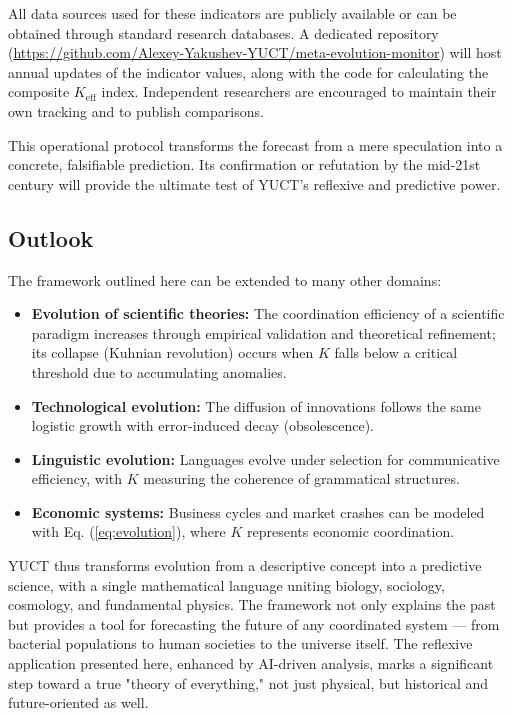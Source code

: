 \documentclass[12pt,a4paper]{article}
\theoremstyle{remark}
\begin{document}
	All data sources used for these indicators are publicly available or can be obtained through standard research databases. A dedicated repository (\url{https://github.com/Alexey-Yakushev-YUCT/meta-evolution-monitor}) will host annual updates of the indicator values, along with the code for calculating the composite \(K_{\text{eff}}\) index. Independent researchers are encouraged to maintain their own tracking and to publish comparisons.
	
	This operational protocol transforms the forecast from a mere speculation into a concrete, falsifiable prediction. Its confirmation or refutation by the mid‑21st century will provide the ultimate test of YUCT’s reflexive and predictive power.
	
	\subsection*{Outlook}
	
	The framework outlined here can be extended to many other domains:
	\begin{itemize}
		\item \textbf{Evolution of scientific theories:} The coordination efficiency of a scientific paradigm increases through empirical validation and theoretical refinement; its collapse (Kuhnian revolution) occurs when $K$ falls below a critical threshold due to accumulating anomalies.
		\item \textbf{Technological evolution:} The diffusion of innovations follows the same logistic growth with error-induced decay (obsolescence).
		\item \textbf{Linguistic evolution:} Languages evolve under selection for communicative efficiency, with $K$ measuring the coherence of grammatical structures.
		\item \textbf{Economic systems:} Business cycles and market crashes can be modeled with Eq. (\ref{eq:evolution}), where $K$ represents economic coordination.
	\end{itemize}
	
	YUCT thus transforms evolution from a descriptive concept into a predictive science, with a single mathematical language uniting biology, sociology, cosmology, and fundamental physics. The framework not only explains the past but provides a tool for forecasting the future of any coordinated system — from bacterial populations to human societies to the universe itself. The reflexive application presented here, enhanced by AI-driven analysis, marks a significant step toward a true "theory of everything," not just physical, but historical and future-oriented as well.
	
\end{document}
